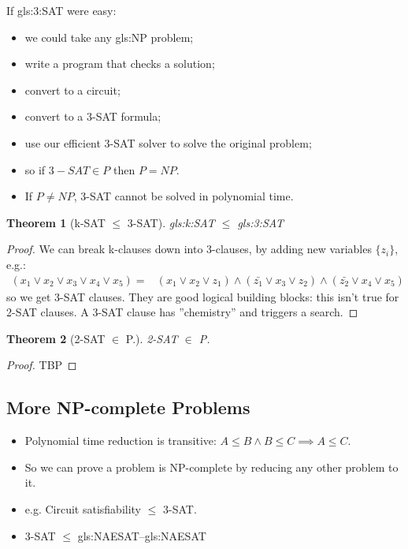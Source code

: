 \documentclass[]{article}
\newtheorem{thm}{Theorem}
\begin{document}
If \gls{gls:3:SAT} were easy:
\begin{itemize}
	\item we could take any \gls{gls:NP} problem;
	\item write a program that checks a solution;
	\item convert to a circuit;
	\item convert to a 3-SAT formula;
	\item use our efficient 3-SAT solver to solve the original problem;
	\item so if $3-SAT \in P$ then $P=NP$.
	\item If $P\ne NP$, 3-SAT cannot be solved in polynomial time.
\end{itemize}

\begin{thm}[k-SAT $\le$ 3-SAT]
	\gls{gls:k:SAT} $\le$ \gls{gls:3:SAT}
\end{thm}

\begin{proof}
	We can break k-clauses down into 3-clauses, by adding new variables $\{z_i\}$, e.g.:
	\begin{align*}
		(x_1 \lor x_2 \lor x_3 \lor x_4 \lor x_5) =& (x_1 \lor x_2 \lor z_1) \land (\bar{z_1} \lor x_3 \lor z_2) \land (\bar{z_2} \lor x_4 \lor x_5)
	\end{align*}
	so we get 3-SAT clauses. They are good logical building blocks: this isn't true for 2-SAT clauses. A 3-SAT clause has ''chemistry'' and triggers a search. 
\end{proof}

\begin{thm}[2-SAT $\in$ P.]
	2-SAT $\in$ P.
\end{thm}

\begin{proof}
	TBP
\end{proof}

\subsection{More NP-complete Problems}

\begin{itemize}
	\item Polynomial time reduction is transitive: $A \le B \land B \le C\implies A \le C$.
	\item So we can prove a problem is NP-complete by reducing any other problem to it.
	\item e.g. Circuit satisfiability $\le$ 3-SAT.
	\item 3-SAT $\le$ \gls{gls:NAESAT}--\glsdesc{gls:NAESAT}
\end{itemize}
\end{document}
